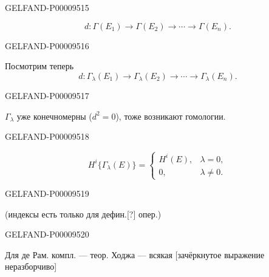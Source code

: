 \begin{GelfandAdjacentEvidence}{GELFAND-P000095}{15}

\begin{equation*}
d:\Gamma(E_1)\longrightarrow\Gamma(E_2)\longrightarrow\cdots\longrightarrow\Gamma(E_n).
\end{equation*}
\end{GelfandAdjacentEvidence}
\begin{GelfandAdjacentEvidence}{GELFAND-P000095}{16}

Посмотрим теперь
\begin{equation*}
d:\Gamma_\lambda(E_1)\longrightarrow\Gamma_\lambda(E_2)\longrightarrow\cdots\longrightarrow\Gamma_\lambda(E_n).
\end{equation*}
\end{GelfandAdjacentEvidence}
\begin{GelfandAdjacentEvidence}{GELFAND-P000095}{17}

$\Gamma_\lambda$ уже конечномерны ($d^2=0$), тоже возникают
гомологии.
\end{GelfandAdjacentEvidence}
\begin{GelfandAdjacentEvidence}{GELFAND-P000095}{18}

\begin{equation*}
H^i\{\Gamma_\lambda(E)\}=\begin{cases}H^i(E),&\lambda=0,\\0,&\lambda\ne0.\end{cases}
\end{equation*}
\end{GelfandAdjacentEvidence}
\begin{GelfandAdjacentEvidence}{GELFAND-P000095}{19}

(индексы есть только для дефин.[?] опер.)
\end{GelfandAdjacentEvidence}
\begin{GelfandAdjacentEvidence}{GELFAND-P000095}{20}

Для де Рам. компл. — теор. Ходжа — всякая [зачёркнутое выражение неразборчиво]
\end{GelfandAdjacentEvidence}
